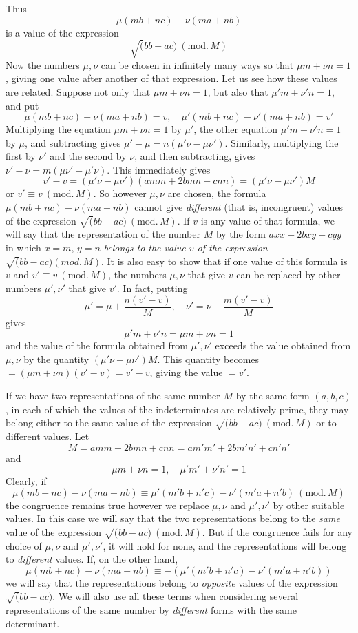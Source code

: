 Thus
\[
\mu(mb+nc)-\nu(ma+nb)
\]
is a value of the expression
\[
\surd(bb-ac)\ (\mathrm{mod.}\,M)
\]
Now the numbers $\mu,\nu$ can be chosen in infinitely many ways so that $\mu m+\nu n=1$, giving one value after another of that expression. Let us see how these values are related. Suppose not only that $\mu m+\nu n=1$, but also that $\mu'm+\nu'n=1$, and put
\[
\mu(mb+nc)-\nu(ma+nb)=v,\quad
\mu'(mb+nc)-\nu'(ma+nb)=v'
\]
Multiplying the equation $\mu m+\nu n=1$ by $\mu'$, the other equation $\mu'm+\nu'n=1$ by $\mu$, and subtracting gives $\mu'-\mu=n(\mu'\nu-\mu\nu')$. Similarly, multiplying the first by $\nu'$ and the second by $\nu$, and then subtracting, gives $\nu'-\nu=m(\mu\nu'-\mu'\nu)$. This immediately gives
\[
v'-v=(\mu'\nu-\mu\nu')(amm+2bmn+cnn)=(\mu'\nu-\mu\nu')M
\]
or $v'\equiv v\ (\mathrm{mod.}\,M)$. So however $\mu,\nu$ are chosen, the formula $\mu(mb+nc)-\nu(ma+nb)$ cannot give \textit{different} (that is, incongruent) values of the expression $\surd(bb-ac)\ (\mathrm{mod.}\,M)$. If $v$ is any value of that formula, we will say that the representation of the number $M$ by the form $axx+2bxy+cyy$ in which $x=m$, $y=n$ \textit{belongs to the value $v$ of the expression $\surd(bb-ac)(\mathit{mod.}\,M)$}. It is also easy to show that if one value of this formula is $v$ and $v'\equiv v\ (\mathrm{mod.}\,M)$, the numbers $\mu,\nu$ that give $v$ can be replaced by other numbers $\mu',\nu'$ that give $v'$. In fact, putting
\[
\mu'=\mu+\frac{n(v'-v)}{M},\quad
\nu'=\nu-\frac{m(v'-v)}{M}
\]
gives
\[
\mu'm+\nu'n=\mu m+\nu n=1
\]
and the value of the formula obtained from $\mu',\nu'$ exceeds the value obtained from $\mu,\nu$ by the quantity $(\mu'\nu-\mu\nu')M$. This quantity becomes $=(\mu m+\nu n)(v'-v)=v'-v$, giving the value $=v'$.

If we have two representations of the same number $M$ by the same form $(a,b,c)$, in each of which the values of the indeterminates are relatively prime, they may belong either to the same value of the expression $\surd(bb-ac)\ (\mathrm{mod.}\,M)$ or to different values. Let
\[
M=amm+2bmn+cnn=am'm'+2bm'n'+cn'n'
\]
and
\[
\mu m+\nu n=1,\quad \mu'm'+\nu'n'=1
\]
Clearly, if
\[
\mu(mb+nc)-\nu(ma+nb)\equiv\mu'(m'b+n'c)-\nu'(m'a+n'b)\ (\mathrm{mod.}\,M)
\]
the congruence remains true however we replace $\mu,\nu$ and $\mu',\nu'$ by other suitable values. In this case we will say that the two representations belong to the \textit{same} value of the expression $\surd(bb-ac)\ (\mathrm{mod.}\,M)$. But if the congruence fails for any choice of $\mu,\nu$ and $\mu',\nu'$, it will hold for none, and the representations will belong to \textit{different} values. If, on the other hand,
\[
\mu(mb+nc)-\nu(ma+nb)\equiv-(\mu'(m'b+n'c)-\nu'(m'a+n'b))
\]
we will say that the representations belong to \textit{opposite} values of the expression $\surd(bb-ac)$. We will also use all these terms when considering several representations of the same number by \textit{different} forms with the same determinant.

